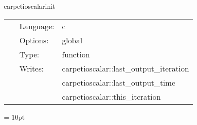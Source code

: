 \vspace{5mm}


\hspace{5mm} carpetioscalarinit 

\hspace{5mm}{\it initialisation routine } 


\hspace{5mm}

 \begin{tabular*}{160mm}{cll} 
~ & Language:  & c \\ 
~ & Options:  & global \\ 
~ & Type:  & function \\ 
~ & Writes:  & carpetioscalar::last\_output\_iteration \\ 
~& ~ &carpetioscalar::last\_output\_time\\ 
~& ~ &carpetioscalar::this\_iteration\\ 
\end{tabular*} 



\vspace{5mm}\parskip = 10pt 

